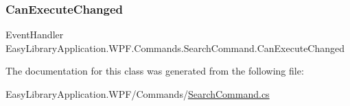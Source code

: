 \subsubsection{\texorpdfstring{Can\+Execute\+Changed}{CanExecuteChanged}}
{\footnotesize\ttfamily Event\+Handler Easy\+Library\+Application.\+W\+P\+F.\+Commands.\+Search\+Command.\+Can\+Execute\+Changed}



The documentation for this class was generated from the following file\+:\begin{DoxyCompactItemize}
\item 
Easy\+Library\+Application.\+W\+P\+F/\+Commands/\mbox{\hyperlink{_search_command_8cs}{Search\+Command.\+cs}}\end{DoxyCompactItemize}
